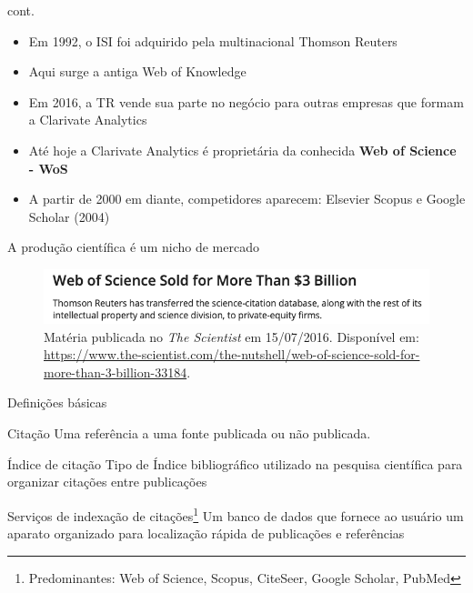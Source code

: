 \begin{frame}{cont.}
\begin{itemize}
\item Em 1992, o ISI foi adquirido pela multinacional Thomson Reuters 
\item Aqui surge a antiga Web of Knowledge
\item Em 2016, a TR vende sua parte no negócio para outras empresas que formam a Clarivate Analytics
\item Até hoje a Clarivate Analytics é proprietária da conhecida \textbf{Web of Science - WoS}
\item A partir de 2000 em diante, competidores aparecem: Elsevier Scopus e Google Scholar (2004)
\end{itemize}
\end{frame}

\begin{frame}{A produção científica é um nicho de mercado}
\begin{figure}
\centering
\includegraphics[scale=0.4]{figs/03/the-scientist}
\caption{Matéria publicada no \textit{The Scientist} em 15/07/2016. Disponível em: 
\url{https://www.the-scientist.com/the-nutshell/web-of-science-sold-for-more-than-3-billion-33184}.}
\end{figure}
\end{frame}

\begin{frame}{Definições básicas}
\begin{block}{Citação}
Uma referência a uma fonte publicada ou não publicada. 
\end{block}
\begin{block}{Índice de citação}
Tipo de Índice bibliográfico utilizado na pesquisa científica para organizar citações entre publicações
\end{block}
\begin{block}{Serviços de indexação de citações\footnote{Predominantes: 
Web of Science, Scopus, CiteSeer, Google Scholar, PubMed}}
Um banco de dados que fornece ao usuário um aparato organizado para localização rápida de publicações e referências
\end{block}
\end{frame}

